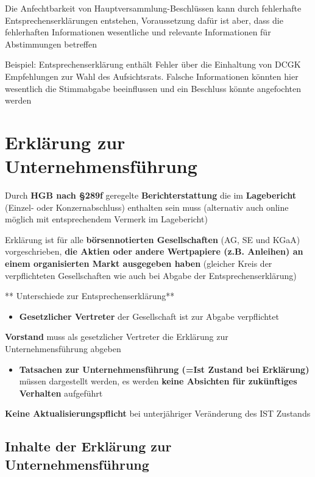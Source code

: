 \documentclass[
]{article}
\providecommand{\tightlist}{%
  \setlength{\itemsep}{0pt}\setlength{\parskip}{0pt}}
\begin{document}
Die Anfechtbarkeit von Hauptversammlung-Beschlüssen kann durch
fehlerhafte Entsprechenserklärungen entstehen, Voraussetzung dafür ist
aber, dass die fehlerhaften Informationen wesentliche und relevante
Informationen für Abstimmungen betreffen

Beispiel: Entsprechenserklärung enthält Fehler über die Einhaltung von
DCGK Empfehlungen zur Wahl des Aufsichtsrats. Falsche Informationen
könnten hier wesentlich die Stimmabgabe beeinflussen und ein Beschluss
könnte angefochten werden

\hypertarget{erkluxe4rung-zur-unternehmensfuxfchrung}{%
\section{Erklärung zur
Unternehmensführung}\label{erkluxe4rung-zur-unternehmensfuxfchrung}}

Durch \textbf{HGB nach §289f }geregelte \textbf{Berichterstattung }die
im \textbf{Lagebericht} (Einzel- oder Konzernabschluss) enthalten sein
muss (alternativ auch online möglich mit entsprechendem Vermerk im
Lagebericht)

Erklärung ist für alle \textbf{börsennotierten Gesellschaften} (AG, SE
und KGaA) vorgeschrieben, \textbf{die Aktien oder andere Wertpapiere
(z.B. Anleihen) an einem organisierten Markt ausgegeben haben} (gleicher
Kreis der verpflichteten Gesellschaften wie auch bei Abgabe der
Entsprechenserklärung)

** Unterschiede zur Entsprechenserklärung**

\begin{itemize}
\tightlist
\item
  \textbf{Gesetzlicher Vertreter} der Gesellschaft ist zur Abgabe
  verpflichtet
\end{itemize}

\textbf{Vorstand} muss als gesetzlicher Vertreter die Erklärung zur
Unternehmensführung abgeben

\begin{itemize}
\tightlist
\item
  \textbf{Tatsachen zur Unternehmensführung (=Ist Zustand bei
  Erklärung)} müssen dargestellt werden, es werden \textbf{keine
  Absichten für zukünftiges Verhalten} aufgeführt
\end{itemize}

\textbf{Keine Aktualisierungspflicht} bei unterjähriger Veränderung des
IST Zustands

\hypertarget{inhalte-der-erkluxe4rung-zur-unternehmensfuxfchrung}{%
\subsection{Inhalte der Erklärung zur
Unternehmensführung}\label{inhalte-der-erkluxe4rung-zur-unternehmensfuxfchrung}}
\end{document}
